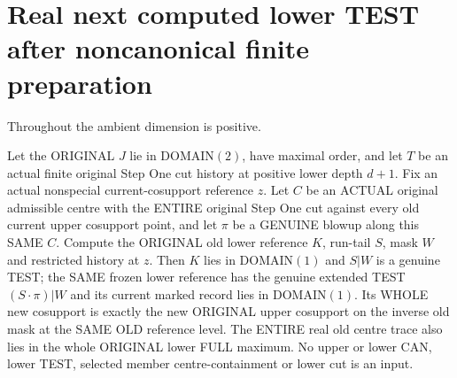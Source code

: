\section{Real next computed lower TEST after noncanonical finite preparation}

Throughout the ambient dimension is positive.
\begin{theorem}
\label{hir:original-finite-cut-prepared-lower-test-data}
\leanok
Let the ORIGINAL $J$ lie in DOMAIN$(2)$, have maximal order, and let $T$
be an actual finite original Step One cut history at positive lower depth
$d+1$. Fix an actual nonspecial current-cosupport reference $z$. Let $C$
be an ACTUAL original admissible centre with the ENTIRE original Step One
cut against every old current upper cosupport point, and let $\pi$ be a
GENUINE blowup along this SAME $C$. Compute the ORIGINAL old lower reference
$K$, run-tail $S$, mask $W$ and restricted history at $z$. Then $K$ lies in
DOMAIN$(1)$ and $S|W$ is a genuine TEST; the SAME frozen lower reference
has the genuine extended TEST $(S\mathbin{\cdot}\pi)|W$ and its current
marked record lies in DOMAIN$(1)$. Its WHOLE new cosupport is exactly the
new ORIGINAL upper cosupport on the inverse old mask at the SAME OLD
reference level. The ENTIRE real old centre trace also lies in the whole
ORIGINAL lower FULL maximum. No upper or lower CAN, lower TEST, selected
member centre-containment or lower cut is an input.
\end{theorem}
